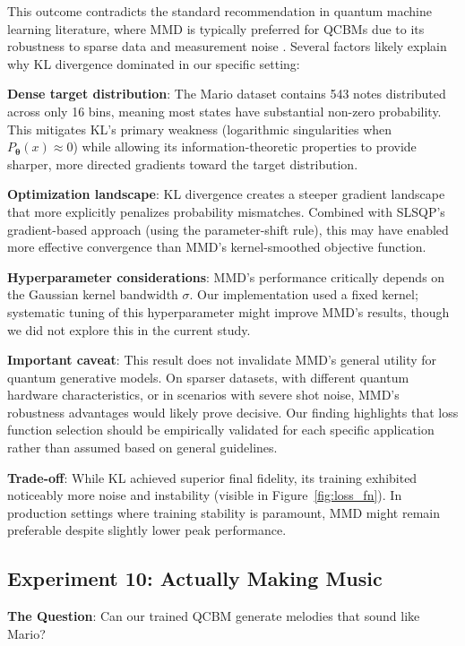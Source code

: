\documentclass[11pt,a4paper]{article}
\begin{document}
This outcome contradicts the standard recommendation in quantum machine learning literature, where MMD is typically preferred for QCBMs due to its robustness to sparse data and measurement noise \cite{Benedetti2019}. Several factors likely explain why KL divergence dominated in our specific setting:

\textbf{Dense target distribution}: The Mario dataset contains 543 notes distributed across only 16 bins, meaning most states have substantial non-zero probability. This mitigates KL's primary weakness (logarithmic singularities when $P_{\boldsymbol{\theta}}(x) \approx 0$) while allowing its information-theoretic properties to provide sharper, more directed gradients toward the target distribution.

\textbf{Optimization landscape}: KL divergence creates a steeper gradient landscape that more explicitly penalizes probability mismatches. Combined with SLSQP's gradient-based approach (using the parameter-shift rule), this may have enabled more effective convergence than MMD's kernel-smoothed objective function.

\textbf{Hyperparameter considerations}: MMD's performance critically depends on the Gaussian kernel bandwidth $\sigma$. Our implementation used a fixed kernel; systematic tuning of this hyperparameter might improve MMD's results, though we did not explore this in the current study.

\textbf{Important caveat}: This result does not invalidate MMD's general utility for quantum generative models. On sparser datasets, with different quantum hardware characteristics, or in scenarios with severe shot noise, MMD's robustness advantages would likely prove decisive. Our finding highlights that loss function selection should be empirically validated for each specific application rather than assumed based on general guidelines.

\textbf{Trade-off}: While KL achieved superior final fidelity, its training exhibited noticeably more noise and instability (visible in Figure~\ref{fig:loss_fn}). In production settings where training stability is paramount, MMD might remain preferable despite slightly lower peak performance.

\subsection{Experiment 10: Actually Making Music}

\textbf{The Question}: Can our trained QCBM generate melodies that sound like Mario?
\end{document}
